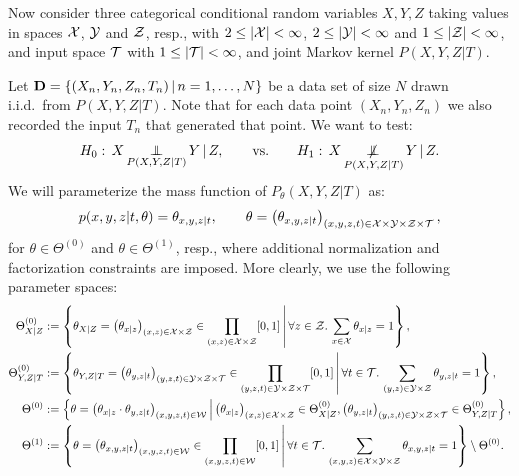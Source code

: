 Now consider three categorical conditional random variables $X,Y,Z$ taking values in spaces $\mathcal{X}$, $\mathcal{Y}$
and $\mathcal{Z}$, resp., with $2 \le  |\mathcal{X}| < \infty$, $2 \le |\mathcal{Y}| < \infty$ and $1 \le |\mathcal{Z}| < \infty$, 
and input space $\mathcal{T}$ with $1 \le |\mathcal{T}| < \infty$, 
and joint Markov kernel  $P(X,Y,Z|T)$.

Let $\mathbf{D}=\left \{ (X_n,Y_n,Z_n,T_n) \,\middle|\, n =1, \dots, N \right \}$ be a data set of size $N$ drawn i.i.d.\ from $P(X,Y,Z|T)$.
Note that for each data point $(X_n,Y_n,Z_n)$ we also recorded the input $T_n$ that generated that point.
We want to test:
\[ H_0:\, X \operatorname*{\perp\mkern-11mu\perp}_{P(X,Y,Z|T)} Y \operatorname*{|} Z, \qquad \text{vs.} \qquad H_1:\,X \operatorname*{\not\mkern-2mu\perp\mkern-11mu\perp}_{P(X,Y,Z|T)} Y \operatorname*{|} Z. \]
We will parameterize the mass function of $P_\theta(X,Y,Z|T)$ as:
\[ p(x,y,z|t,\theta) = \theta_{x,y,z|t}, \qquad \theta = \left ( \theta_{x,y,z|t} \right )_{(x,y,z,t) \in \mathcal{X}\times\mathcal{Y}\times\mathcal{Z}\times\mathcal{T}}, \]
for $\theta \in \Theta^{(0)}$ and $\theta \in \Theta^{(1)}$, resp., where additional normalization and factorization constraints are imposed. 
More clearly, we use the following parameter spaces:
\begin{align*}
    \Theta^{(0)}_{X|Z} &:= \left \{ \theta_{X|Z} =\left ( \theta_{x|z} \right )_{(x,z) \in \mathcal{X}\times\mathcal{Z}}  \in \prod_{(x,z) \in \mathcal{X}\times\mathcal{Z}} [0,1] \,\middle|\, \forall z \in \mathcal{Z}. \, \sum_{x \in \mathcal{X}} \theta_{x|z} =1   \right \},\\
    \Theta^{(0)}_{Y,Z|T} &:= \left \{ \theta_{Y,Z|T} =\left ( \theta_{y,z|t} \right )_{(y,z,t) \in \mathcal{Y}\times\mathcal{Z}\times\mathcal{T}}  \in \prod_{(y,z,t) \in \mathcal{Y}\times\mathcal{Z}\times\mathcal{T}} [0,1] \,\middle|\, \forall t \in \mathcal{T}. \, \sum_{(y,z) \in \mathcal{Y}\times\mathcal{Z}} \theta_{y,z|t} =1   \right \},\\
    \Theta^{(0)} &:= \left \{ \theta = \left ( \theta_{x|z} \cdot \theta_{y,z|t} \right )_{(x,y,z,t) \in\mathcal{W}} \,\middle|\, \left ( \theta_{x|z} \right )_{(x,z) \in \mathcal{X}\times\mathcal{Z}}  \in \Theta^{(0)}_{X|Z},\left ( \theta_{y,z|t} \right )_{(y,z,t) \in \mathcal{Y}\times\mathcal{Z}\times\mathcal{T}} \in \Theta^{(0)}_{Y,Z|T}  \right \},\\
    \Theta^{(1)} &:= \left \{ \theta = \left ( \theta_{x,y,z|t} \right )_{(x,y,z,t) \in\mathcal{W}} \in \prod_{(x,y,z,t) \in\mathcal{W}}  [0,1]  \,\middle|\, 
    \forall t \in \mathcal{T}. \, \sum_{(x,y,z) \in\mathcal{X}\times\mathcal{Y}\times\mathcal{Z}} \theta_{x,y,z|t} =1 \right \} \setminus \Theta^{(0)}.
\end{align*}

